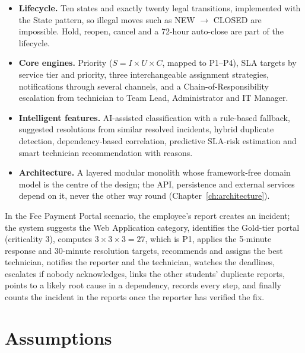 \begin{itemize}
  \item \textbf{Lifecycle.} Ten states and exactly twenty legal transitions, implemented with
    the State pattern, so illegal moves such as NEW $\rightarrow$ CLOSED are impossible. Hold,
    reopen, cancel and a 72-hour auto-close are part of the lifecycle.
  \item \textbf{Core engines.} Priority ($S = I \times U \times C$, mapped to P1--P4), SLA targets
    by service tier and priority, three interchangeable assignment strategies, notifications
    through several channels, and a Chain-of-Responsibility escalation from technician to
    Team Lead, Administrator and IT Manager.
  \item \textbf{Intelligent features.} AI-assisted classification with a rule-based fallback,
    suggested resolutions from similar resolved incidents, hybrid duplicate detection,
    dependency-based correlation, predictive SLA-risk estimation and smart technician
    recommendation with reasons.
  \item \textbf{Architecture.} A layered modular monolith whose framework-free domain model is
    the centre of the design; the API, persistence and external services depend on it, never
    the other way round (Chapter~\ref{ch:architecture}).
\end{itemize}

In the Fee Payment Portal scenario, the employee's report creates an incident; the system
suggests the Web Application category, identifies the Gold-tier portal (criticality 3), computes
$3 \times 3 \times 3 = 27$, which is P1, applies the 5-minute response and 30-minute resolution
targets, recommends and assigns the best technician, notifies the reporter and the technician,
watches the deadlines, escalates if nobody acknowledges, links the other students' duplicate
reports, points to a likely root cause in a dependency, records every step, and finally counts
the incident in the reports once the reporter has verified the fix.

\section{Assumptions}

